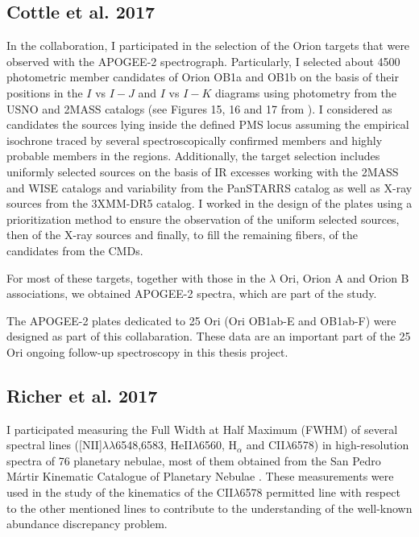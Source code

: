 \documentclass[12pt]{article}
\begin{document}
\subsection{Cottle et al. 2017}
\label{sec:Cottle}
In the \citet{Cottle2018} collaboration, I participated in the selection of the Orion targets that were observed with the APOGEE-2 spectrograph. Particularly, I selected about 4500 photometric member candidates of Orion OB1a and OB1b on the basis of their positions in the $I$ vs $I-J$ and $I$ vs $I-K$ diagrams using photometry from the USNO and 2MASS catalogs (see Figures 15, 16 and 17 from \citealt{Cottle2018}). I considered as candidates the sources lying inside the defined PMS locus assuming the empirical isochrone traced by several spectroscopically confirmed members and highly probable members in the regions. Additionally, the target selection includes uniformly selected sources on the basis of IR excesses working with the 2MASS and WISE catalogs and variability from the PanSTARRS catalog as well as X-ray sources from the 3XMM-DR5 catalog. I worked in the design of the plates using a prioritization method to ensure the observation of the uniform selected sources, then of the X-ray sources and finally, to fill the remaining fibers, of the candidates from the CMDs.

For most of these targets, together with those in the $\lambda$ Ori, Orion A and Orion B associations, we obtained APOGEE-2 spectra, which are part of the \citet{Kounkel2018} study. 

The APOGEE-2 plates dedicated to 25 Ori (Ori OB1ab-E and OB1ab-F) were designed as part of this collabaration. These data are an important part of the 25 Ori ongoing follow-up spectroscopy in this thesis project.

\subsection{Richer et al. 2017}
\label{sec:Richer}
I participated measuring the Full Width at Half Maximum (FWHM) of several spectral lines ([NII]$\lambda\lambda$6548,6583, HeII$\lambda$6560, H$_\alpha$ and CII$\lambda$6578) in high-resolution spectra of 76 planetary nebulae, most of them obtained from the San Pedro M\'artir Kinematic Catalogue of Planetary Nebulae \citep{Lopez2012}. These measurements were used in the \citet{Richer2017} study of the kinematics of the CII$\lambda$6578 permitted line with respect to the other mentioned lines to contribute to the understanding of the well-known abundance discrepancy problem.
\end{document}
